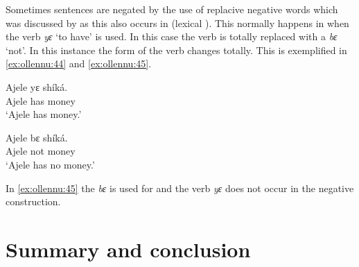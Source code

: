 \documentclass[output=paper
,newtxmath
,modfonts
,nonflat]{langsci/langscibook}
\begin{document}
Sometimes sentences are negated by the use of replacive negative words which was discussed by \citet[23]{caesar2012} as this also occurs in  (lexical ). This normally happens in  when the verb \textit{yɛ} `to have' is used. In this case the verb is totally replaced with a  \textit{bɛ} `not'. In this instance the form of the verb changes totally. This is exemplified in \ref{ex:ollennu:44} and \ref{ex:ollennu:45}.

\begin{minipage}{.5\textwidth}
\ea \label{ex:ollennu:44}
\gll Ajele yɛ sh\'ik\'a.\\
Ajele has money\\
\glt `Ajele has money.'
\z
\end{minipage}
\begin{minipage}{.5\textwidth}
\ea \label{ex:ollennu:45}
\gll Ajele bɛ sh\'ik\'a.\\
Ajele not money\\
\glt`Ajele has no money.'
\z
\end{minipage}

In \ref{ex:ollennu:45} the  \textit{bɛ} is used for  and the verb \textit{yɛ} does not occur in the negative construction.

\section{\label{sec:ollennu:3} Summary and conclusion}
\end{document}
